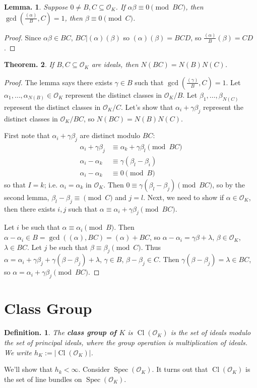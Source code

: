 \documentclass[11pt, a4paper]{memoir}
\theoremstyle{change}
\newtheorem{theorem}{Theorem.}[section]
\newtheorem{lemma}[theorem]{Lemma.}
\theoremstyle{plain}
\theoremstyle{nonumberplain}
\newtheorem{definition}{Definition.}
\newtheorem{proof}{Proof}
\DeclareMathOperator{\Spec}{Spec}
\DeclareMathOperator{\Cl}{Cl}
\numberwithin{equation}{section}
\begin{document}
\begin{lemma}
    Suppose $0\neq B,C\subseteq\mathcal{O}_K$.
    If $\alpha\beta\equiv 0\pmod{BC}$, then $\gcd\left(\frac{(\alpha)}{B},C\right)=1$, then $\beta\equiv 0\pmod{C}$.
\end{lemma}
\begin{proof}
    Since $\alpha\beta\in BC$, $BC|(\alpha)(\beta)$ so $(\alpha)(\beta)=BCD$, so $\frac{(\alpha)}{B}(\beta)=CD$.
\end{proof}
\begin{theorem}
    If $B,C\subseteq\mathcal{O}_K$ are ideals, then $N(BC)=N(B)N(C)$.
\end{theorem}
\begin{proof}
    The lemma says there exists $\gamma\in B$ such that $\gcd\left(\frac{(\gamma)}{B},C\right)=1$.
    Let $\alpha_1,\ldots,\alpha_{N(B)}\in\mathcal{O}_K$ represent the distinct classes in $\mathcal{O}_K/B$.
    Let $\beta_1,\ldots,\beta_{N(C)}$ represent the distinct classes in $\mathcal{O}_K/C$.
    Let's show that $\alpha_i+\gamma\beta_j$ represent the distinct classes in $\mathcal{O}_K/BC$, so $N(BC)=N(B)N(C)$.

    First note that $\alpha_i+\gamma\beta_j$ are distinct modulo $BC$:
    \begin{align*}
        \alpha_i+\gamma\beta_j &\equiv\alpha_k+\gamma\beta_l\pmod{BC}\\
        \alpha_i-\alpha_k &\equiv\gamma(\beta_l-\beta_i)\\
        \alpha_i-\alpha_k &\equiv 0\pmod{B}
    \end{align*}
    so that $I=k$; i.e. $\alpha_i=\alpha_k$ in $\mathcal{O}_K$.
    Then $0\equiv\gamma(\beta_l-\beta_j)\pmod{BC}$, so by the second lemma, $\beta_l-\beta_j\equiv \pmod{C}$ and $j=l$.
    Next, we need to show if $\alpha\in\mathcal{O}_K$, then there exists $i,j$ such that $\alpha\equiv\alpha_i+\gamma\beta_j\pmod{BC}$.

    Let $i$ be such that $\alpha\equiv\alpha_i\pmod{B}$.
    Then $\alpha-\alpha_i\in B=\gcd((\alpha),BC)=(\alpha)+BC$, so $\alpha-\alpha_i=\gamma\beta+\lambda$, $\beta\in\mathcal{O}_K$, $\lambda\in BC$.
    Let $j$ be such that $\beta\equiv\beta_j\pmod{C}$.
    Thus $\alpha=\alpha_i+\gamma\beta_j+\gamma(\beta-\beta_j)+\lambda$, $\gamma\in B$, $\beta-\beta_j\in C$.
    Then $\gamma(\beta-\beta_j)=\lambda\in BC$, so $\alpha=\alpha_i+\gamma\beta_j\pmod{BC}$.
\end{proof}
\section{Class Group}
\begin{definition}
    The \textbf{class group of $K$} is $\Cl(\mathcal{O}_K)$ is the set of ideals modulo the set of principal ideals, where the group operation is multiplication of ideals.
    We write $h_K:=|\Cl(\mathcal{O}_K)|$.
\end{definition}
We'll show that $h_k<\infty$.
Consider $\Spec(\mathcal{O}_K)$.
It turns out that $\Cl(\mathcal{O}_K)$ is the set of line bundles on $\Spec(\mathcal{O}_K)$.
\end{document}
